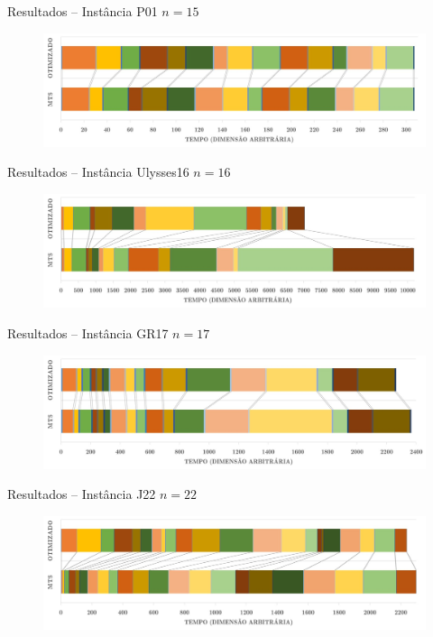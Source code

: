 \documentclass{beamer}
\begin{document}
\begin{frame}{Resultados -- Instância P01 }
$n = 15$
\begin{figure}[h]
\centering
\includegraphics[scale=0.5]{GraficoP01}
\end{figure}
\end{frame}
\begin{frame}{Resultados -- Instância Ulysses16}
$n = 16$
\begin{figure}[h]
\centering
\includegraphics[scale=0.5]{GraficoU16}
\end{figure}
\end{frame}
\begin{frame}{Resultados -- Instância GR17 }
$n = 17$
\begin{figure}[h]
\centering
\includegraphics[scale=0.5]{GraficoGR17}
\end{figure}
\end{frame}
\begin{frame}{Resultados -- Instância J22 }
$n = 22$
\begin{figure}[h]
\centering
\includegraphics[scale=0.5]{GraficoJ22}
\end{figure}
\end{frame}
\end{document}
